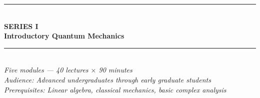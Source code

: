 \documentclass[11pt,a4paper]{article}
\begin{document}
\newpage

\newpage
\thispagestyle{empty}
\pagecolor{darkblue}
\color{white}
\vspace*{2.2cm}
\begin{center}
  {\color{accentgold}\rule{11cm}{1.5pt}}\\[0.5cm]
  {\fontsize{11}{14}\selectfont\bfseries\color{accentgold}\MakeUppercase{Series I}}\\[0.3cm]
  {\fontsize{26}{32}\selectfont\bfseries Introductory Quantum Mechanics}\\[0.4cm]
  {\color{accentgold}\rule{11cm}{1.5pt}}\\[1.0cm]
  {\large\itshape Five modules --- 40 lectures $\times$ 90 minutes}\\[0.5cm]
  {\normalsize\itshape Audience: Advanced undergraduates through early graduate students}\\[0.3cm]
  {\normalsize\itshape Prerequisites: Linear algebra, classical mechanics, basic complex analysis}\\[1.6cm]


\end{center}
\end{document}
